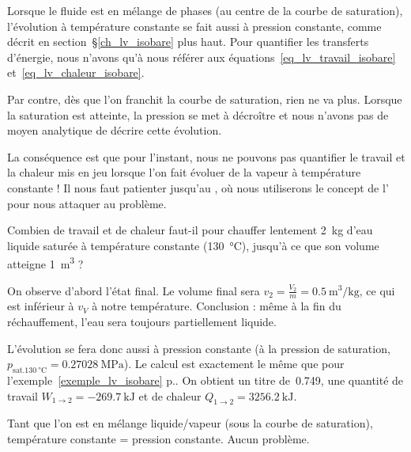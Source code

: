 		Lorsque le fluide est en mélange de phases (au centre de la courbe de saturation), l’évolution à température constante se fait aussi à pression constante, comme décrit en section~\S\ref{ch_lv_isobare} plus haut. Pour quantifier les transferts d’énergie, nous n’avons qu’à nous référer aux équations~\ref{eq_lv_travail_isobare} et~\ref{eq_lv_chaleur_isobare}.

		Par contre, dès que l’on franchit la courbe de saturation, rien ne va plus. Lorsque la saturation est atteinte, la pression se met à décroître et nous n’avons pas de moyen analytique de décrire cette évolution.
		
		La conséquence est que pour l’instant, nous ne pouvons pas quantifier le travail et la chaleur mis en jeu lorsque l’on fait évoluer de la vapeur à température constante ! Il nous faut patienter jusqu’au \courshuitshort, où nous utiliserons le concept de l’ pour nous attaquer au problème.
		
			\begin{anexample}
				\label{ch_exemple_isotherme_lv_un}
			
			Combien de travail et de chaleur faut-il pour chauffer lentement \SI{2}{\kilogram} d’eau liquide saturée à température constante (\SI{130}{\degreeCelsius}), jusqu’à ce que son volume atteigne \SI{1}{\metre\cubed} ?
			
				\begin{answer}
				On observe d’abord l’état final. Le volume final sera $v_2 = \frac{V_2}{m} = \SI{0,5}{\metre\cubed\per\kilogram} $, ce qui est inférieur à $v_V$ à notre température. Conclusion : même à la fin du réchauffement, l’eau sera toujours partiellement liquide.
				
				L’évolution se fera donc aussi à pression constante (à la pression de saturation, $p_{\text{sat.} \SI{130}{\degreeCelsius}} = \SI{0,27028}{\mega\pascal} $). Le calcul est exactement le même que pour l’exemple~\ref{exemple_lv_isobare} p.\pageref{exemple_lv_isobare}. On obtient un titre de~\num{0,749}, une quantité de travail $W_{1\to2} = \SI{-269,7}{\kilo\joule}$ et de chaleur $Q_{1\to2} = \SI{+3256,2}{\kilo\joule}$.				
				
				\begin{remark}Tant que l’on est en mélange liquide/vapeur (sous la courbe de saturation), température constante = pression constante. Aucun problème.\end{remark}\end{answer}
			\end{anexample}
			
